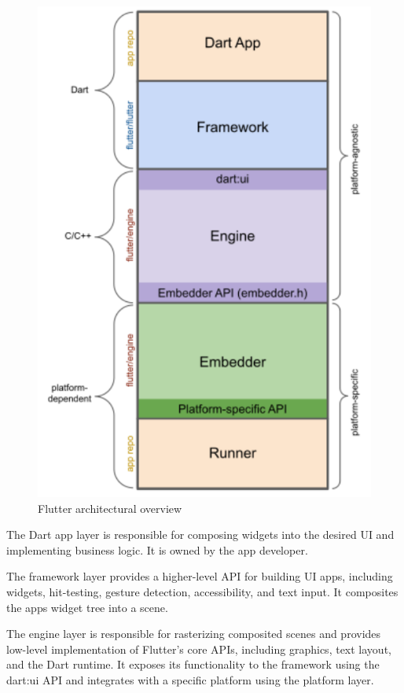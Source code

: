 \documentclass[conference]{IEEEtran}
\begin{document}
\begin{figure}[ht]
	\centerline{\includegraphics[width=\linewidth]{figures/app-anatomy}}
	\caption{Flutter architectural overview \cite{b1.1}}
	\label{fig:flutter_tech_stack}
\end{figure}

The Dart app layer is responsible for composing widgets into the desired UI and implementing business logic. It is owned by the app developer.

The framework layer provides a higher-level API for building UI apps, including widgets, hit-testing, gesture detection, accessibility, and text input. It composites the apps widget tree into a scene.

The engine layer is responsible for rasterizing composited scenes and provides low-level implementation of Flutter's core APIs, including graphics, text layout, and the Dart runtime. It exposes its functionality to the framework using the dart:ui API and integrates with a specific platform using the platform layer.
\end{document}
